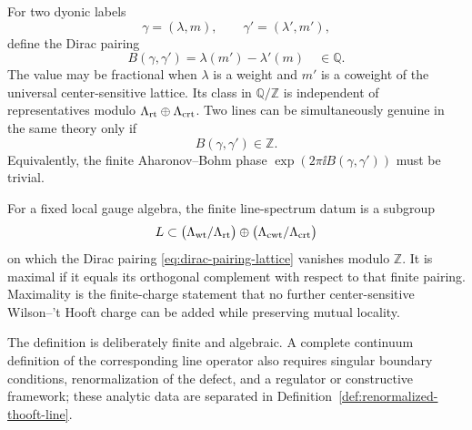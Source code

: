 For two dyonic labels
\[
  \gamma=(\lambda,m),
  \qquad
  \gamma'=(\lambda',m'),
\]
define the Dirac pairing
\begin{equation}
  B(\gamma,\gamma')
  =
  \lambda(m')-\lambda'(m)
  \quad\in\mathbb Q .
  \label{eq:dirac-pairing-lattice}
\end{equation}
The value may be fractional when \(\lambda\) is a weight and \(m'\) is a
coweight of the universal center-sensitive lattice.  Its class in
\(\mathbb Q/\mathbb Z\) is independent of representatives modulo
\(\Lambda_{\rm rt}\oplus\Lambda_{\rm crt}\).  Two lines can be simultaneously
genuine in the same theory only if
\begin{equation}
  B(\gamma,\gamma')\in\mathbb Z .
  \label{eq:mutual-locality-dirac-condition}
\end{equation}
Equivalently, the finite Aharonov--Bohm phase
\(\exp(2\pi\ii B(\gamma,\gamma'))\) must be trivial.

\begin{definition}
\label{def:finite-line-spectrum-datum}
For a fixed local gauge algebra, the finite line-spectrum datum is a subgroup
\[
  L\subset
  \bigl(\Lambda_{\rm wt}/\Lambda_{\rm rt}\bigr)
  \oplus
  \bigl(\Lambda_{\rm cwt}/\Lambda_{\rm crt}\bigr)
\]
on which the Dirac pairing \eqref{eq:dirac-pairing-lattice} vanishes modulo
\(\mathbb Z\).  It is maximal if it equals its orthogonal complement with
respect to that finite pairing.  Maximality is the finite-charge statement
that no further center-sensitive Wilson--'t Hooft charge can be added while
preserving mutual locality.
\end{definition}

The definition is deliberately finite and algebraic.  A complete continuum
definition of the corresponding line operator also requires singular
boundary conditions, renormalization of the defect, and a regulator or
constructive framework; these analytic data are separated in
Definition~\ref{def:renormalized-thooft-line}.

